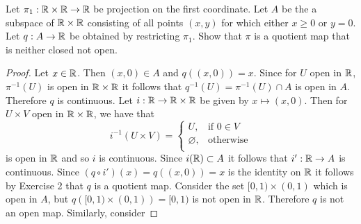 \begin{ex}{22.3}
    Let $\pi_1:\mathbb{R}\times\mathbb{R}\to\mathbb{R}$ be projection on the first coordinate. 
    Let $A$ be the a subspace of $\mathbb{R}\times\mathbb{R}$ consisting of all points $(x,y)$ for which either $x\geq 0$ or $y=0$.
    Let $q:A\to\mathbb{R}$ be obtained by restricting $\pi_1$. Show that $\pi$ is a quotient map that is neither closed not open.
\end{ex}
\begin{proof}
    Let $x\in\mathbb{R}$. Then $(x,0)\in A$ and $q\left((x,0)\right)=x$. Since for $U$ open in $\mathbb{R}$, $\pi^{-1}(U)$ is open in $\mathbb{R}\times\mathbb{R}$ it follows that $q^{-1}(U)=\pi^{-1}(U)\cap A$ is open in $A$.
    Therefore $q$ is continuous. Let $i:\mathbb{R}\to\mathbb{R}\times\mathbb{R}$ be given by $x\mapsto(x,0)$. 
    Then for $U\times V$ open in $\mathbb{R}\times\mathbb{R}$, we have that
    $$i^{-1}(U\times V)=\begin{cases}
        U,&\text{if } 0\in V\\
        \varnothing,&\text{otherwise}\\
    \end{cases}$$
    is open in $\mathbb{R}$ and so $i$ is continuous. 
    Since $i(\mathbb{R})\subset A$ it follows that $i':\mathbb{R}\to A$ is continuous. 
    Since $(q\circ i')(x)=q((x,0))=x$ is the identity on $\mathbb{R}$ it follows by Exercise 2 that $q$ is a quotient map.
    Consider the set $[0,1)\times(0,1)$ which is open in $A$, but $q\left([0,1)\times(0,1)\right)=[0,1)$ is not open in $\mathbb{R}$.
    Therefore $q$ is not an open map. Similarly, consider 
\end{proof}